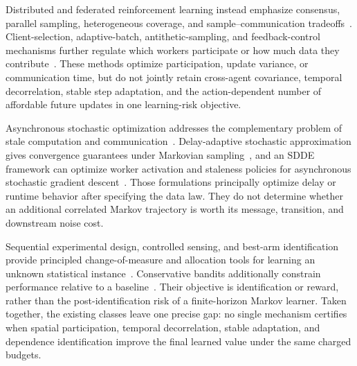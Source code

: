 \documentclass[journal]{IEEEtran}
\begin{document}
Distributed and federated reinforcement learning instead emphasize consensus, parallel sampling, heterogeneous coverage, and sample--communication tradeoffs~\cite{doan2019distributed,zhang2018decentralized,khodadadian2022federated,woo2023heterogeneity,salgia2024tradeoff,lan2023communication}.
Client-selection, adaptive-batch, antithetic-sampling, and feedback-control mechanisms further regulate which workers participate or how much data they contribute~\cite{fraboni2021clustered,de2017adaptive,cummins2025feedback,perazzone2025lyapunov,ren2019antithetic}.
These methods optimize participation, update variance, or communication time, but do not jointly retain cross-agent covariance, temporal decorrelation, stable step adaptation, and the action-dependent number of affordable future updates in one learning-risk objective.

Asynchronous stochastic optimization addresses the complementary problem of stale computation and communication~\cite{agarwal2011distributed,lian2015asynchronous,arjevani2020delayed}.
Delay-adaptive stochastic approximation gives convergence guarantees under Markovian sampling~\cite{adibi2024delayed,dalfabbro2024dasa}, and an SDDE framework can optimize worker activation and staleness policies for asynchronous stochastic gradient descent~\cite{yu2025sdde}.
Those formulations principally optimize delay or runtime behavior after specifying the data law.
They do not determine whether an additional correlated Markov trajectory is worth its message, transition, and downstream noise cost.

Sequential experimental design, controlled sensing, and best-arm identification provide principled change-of-measure and allocation tools for learning an unknown statistical instance~\cite{chernoff1959sequential,nitinawarat2015controlled,kaufmann2016complexity,garivier2016optimal,moulos2019markovian,saad2023covariance,vannella2023multiagent}.
Conservative bandits additionally constrain performance relative to a baseline~\cite{wu2016conservative}.
Their objective is identification or reward, rather than the post-identification risk of a finite-horizon Markov learner.
Taken together, the existing classes leave one precise gap: no single mechanism certifies when spatial participation, temporal decorrelation, stable adaptation, and dependence identification improve the final learned value under the same charged budgets.
\end{document}

